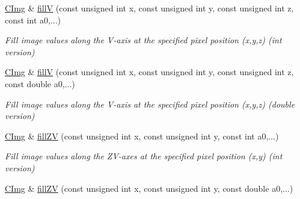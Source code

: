 \begin{DoxyCompactItemize}
\item 
\hypertarget{structcimg__library_1_1_c_img_a48062c043b6a1df266c5efa43d87f123}{\hyperlink{structcimg__library_1_1_c_img}{C\-Img} \& \hyperlink{structcimg__library_1_1_c_img_a48062c043b6a1df266c5efa43d87f123}{fill\-V} (const unsigned int x, const unsigned int y, const unsigned int z, const int a0,...)}\label{structcimg__library_1_1_c_img_a48062c043b6a1df266c5efa43d87f123}

\begin{DoxyCompactList}\small\item\em Fill image values along the V-\/axis at the specified pixel position (x,y,z) (int version) \end{DoxyCompactList}\item 
\hypertarget{structcimg__library_1_1_c_img_a1a5d7b1c757f38300f440774bba1ef31}{\hyperlink{structcimg__library_1_1_c_img}{C\-Img} \& \hyperlink{structcimg__library_1_1_c_img_a1a5d7b1c757f38300f440774bba1ef31}{fill\-V} (const unsigned int x, const unsigned int y, const unsigned int z, const double a0,...)}\label{structcimg__library_1_1_c_img_a1a5d7b1c757f38300f440774bba1ef31}

\begin{DoxyCompactList}\small\item\em Fill image values along the V-\/axis at the specified pixel position (x,y,z) (double version) \end{DoxyCompactList}\item 
\hypertarget{structcimg__library_1_1_c_img_ade0fcbb6f39870e03a17e14b7e5dbd8b}{\hyperlink{structcimg__library_1_1_c_img}{C\-Img} \& \hyperlink{structcimg__library_1_1_c_img_ade0fcbb6f39870e03a17e14b7e5dbd8b}{fill\-Z\-V} (const unsigned int x, const unsigned int y, const int a0,...)}\label{structcimg__library_1_1_c_img_ade0fcbb6f39870e03a17e14b7e5dbd8b}

\begin{DoxyCompactList}\small\item\em Fill image values along the Z\-V-\/axes at the specified pixel position (x,y) (int version) \end{DoxyCompactList}\item 
\hypertarget{structcimg__library_1_1_c_img_a6cd41b020872115e6a6cbc0b761dc25f}{\hyperlink{structcimg__library_1_1_c_img}{C\-Img} \& \hyperlink{structcimg__library_1_1_c_img_a6cd41b020872115e6a6cbc0b761dc25f}{fill\-Z\-V} (const unsigned int x, const unsigned int y, const double a0,...)}\label{structcimg__library_1_1_c_img_a6cd41b020872115e6a6cbc0b761dc25f}


\end{DoxyCompactItemize}
